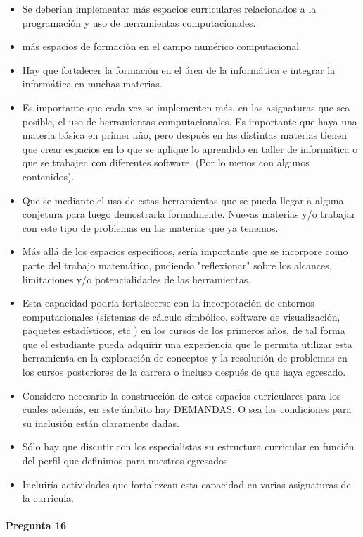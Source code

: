 \documentclass[a4paper,10pt,BCOR10mm,oneside,headsepline]{scrbook}
\begin{document}
\begin{subappendices}
\begin{itemize}
\item Se deberían implementar más espacios curriculares relacionados  a la programación y uso de herramientas computacionales.
\item más espacios de formación en el campo numérico computacional
\item Hay que fortalecer la formación en el área de la informática e integrar la informática en muchas materias. 
\item Es importante que cada vez se implementen más, en las asignaturas que sea posible, el uso de herramientas computacionales. Es importante que haya una materia básica en primer año, pero después en las distintas materias tienen que crear espacios en lo que se aplique lo aprendido en taller de informática o que se trabajen con diferentes software. (Por lo menos con algunos contenidos).
\item Que se mediante el uso de estas herramientas que se pueda llegar a alguna conjetura para luego demostrarla formalmente.
Nuevas materias y/o trabajar con este tipo de problemas en las materias que ya tenemos.
\item Más allá de los espacios específicos, sería importante que se incorpore como parte del trabajo matemático, pudiendo "reflexionar" sobre los alcances, limitaciones y/o potencialidades de las herramientas.
\item Esta capacidad podría fortalecerse con la incorporación de  entornos computacionales (sistemas de cálculo simbólico, software de visualización, paquetes estadísticos, etc ) en los cursos de los primeros años, de tal forma que el estudiante pueda adquirir una experiencia que le permita utilizar esta herramienta en la exploración de conceptos y la resolución de problemas en los cursos posteriores de la carrera o incluso después de que haya egresado. 
\item Considero necesario la construcción de estos espacios curriculares para los cuales además, en este ámbito  hay DEMANDAS. O sea las condiciones para su inclusión están claramente dadas. \item Sólo hay que discutir con los especialistas su estructura curricular en función del perfil que definimos para nuestros egresados.
\item Incluiría actividades que fortalezcan esta capacidad en varias asignaturas de la curricula. 
 
 \end{itemize}
 
 
    \paragraph{Pregunta 16}
\begin{center}
 

\end{center}
\end{subappendices}
\end{document}
